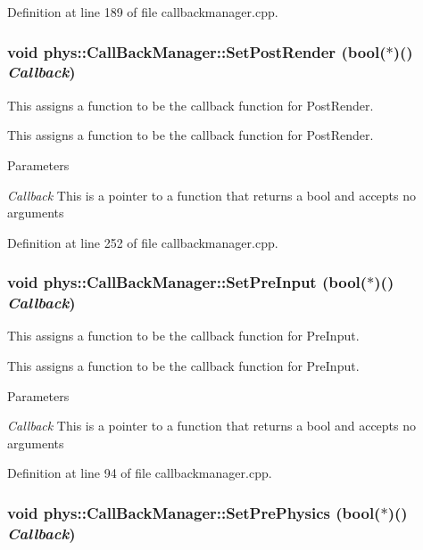 Definition at line 189 of file callbackmanager.cpp.

\hypertarget{classphys_1_1CallBackManager_afe6a91491f3872599d2c5784a902361a}{
\subsubsection[{SetPostRender}]{\setlength{\rightskip}{0pt plus 5cm}void phys::CallBackManager::SetPostRender (bool($\ast$)() {\em Callback})}}
\label{d1/d47/classphys_1_1CallBackManager_afe6a91491f3872599d2c5784a902361a}


This assigns a function to be the callback function for PostRender. 

This assigns a function to be the callback function for PostRender. 
\begin{DoxyParams}{Parameters}
\item[{\em Callback}]This is a pointer to a function that returns a bool and accepts no arguments \end{DoxyParams}


Definition at line 252 of file callbackmanager.cpp.

\hypertarget{classphys_1_1CallBackManager_a1efb0c185304376986093beebf08a277}{
\subsubsection[{SetPreInput}]{\setlength{\rightskip}{0pt plus 5cm}void phys::CallBackManager::SetPreInput (bool($\ast$)() {\em Callback})}}
\label{d1/d47/classphys_1_1CallBackManager_a1efb0c185304376986093beebf08a277}


This assigns a function to be the callback function for PreInput. 

This assigns a function to be the callback function for PreInput. 
\begin{DoxyParams}{Parameters}
\item[{\em Callback}]This is a pointer to a function that returns a bool and accepts no arguments \end{DoxyParams}


Definition at line 94 of file callbackmanager.cpp.

\hypertarget{classphys_1_1CallBackManager_a3f06ccacd416b3109f20c30cd30f9efe}{
\subsubsection[{SetPrePhysics}]{\setlength{\rightskip}{0pt plus 5cm}void phys::CallBackManager::SetPrePhysics (bool($\ast$)() {\em Callback})}}
\label{d1/d47/classphys_1_1CallBackManager_a3f06ccacd416b3109f20c30cd30f9efe}


